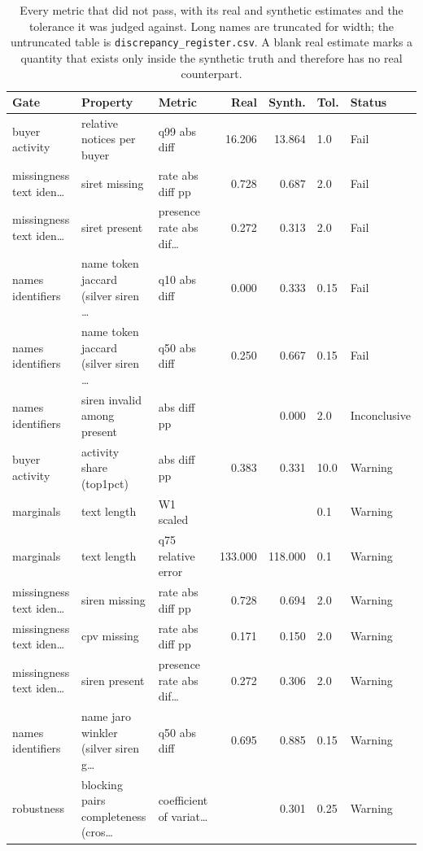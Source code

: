 \begin{table}[htbp]
\centering
\scriptsize
\caption{Every metric that did not pass, with its real and synthetic estimates and the tolerance it was judged against. Long names are truncated for width; the untruncated table is \texttt{discrepancy\_register.csv}. A blank real estimate marks a quantity that exists only inside the synthetic truth and therefore has no real counterpart.}
\label{tab:discrepancies}
\begin{tabularx}{\textwidth}{>{\raggedright\arraybackslash}X>{\raggedright\arraybackslash}X>{\raggedright\arraybackslash}Xrrll}
\toprule
Gate & Property & Metric & Real & Synth. & Tol. & Status \\
\midrule
buyer activity & relative notices per buyer & q99 abs diff & 16.206 & 13.864 & 1.0 & Fail \\
missingness text iden… & siret missing & rate abs diff pp & 0.728 & 0.687 & 2.0 & Fail \\
missingness text iden… & siret present & presence rate abs dif… & 0.272 & 0.313 & 2.0 & Fail \\
names identifiers & name token jaccard (silver siren … & q10 abs diff & 0.000 & 0.333 & 0.15 & Fail \\
names identifiers & name token jaccard (silver siren … & q50 abs diff & 0.250 & 0.667 & 0.15 & Fail \\
names identifiers & siren invalid among present & abs diff pp &  & 0.000 & 2.0 & Inconclusive \\
buyer activity & activity share (top1pct) & abs diff pp & 0.383 & 0.331 & 10.0 & Warning \\
marginals & text length & W1 scaled &  &  & 0.1 & Warning \\
marginals & text length & q75 relative error & 133.000 & 118.000 & 0.1 & Warning \\
missingness text iden… & siren missing & rate abs diff pp & 0.728 & 0.694 & 2.0 & Warning \\
missingness text iden… & cpv missing & rate abs diff pp & 0.171 & 0.150 & 2.0 & Warning \\
missingness text iden… & siren present & presence rate abs dif… & 0.272 & 0.306 & 2.0 & Warning \\
names identifiers & name jaro winkler (silver siren g… & q50 abs diff & 0.695 & 0.885 & 0.15 & Warning \\
robustness & blocking pairs completeness (cros… & coefficient of variat… &  & 0.301 & 0.25 & Warning \\

\end{tabularx}
\end{table}
